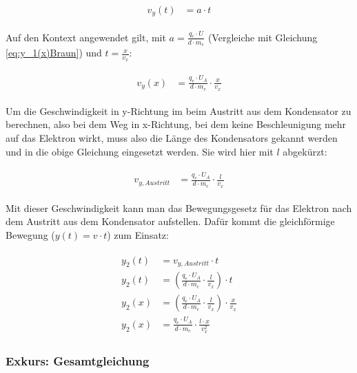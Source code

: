 \begin{align} \label{eq:v(t)Allgemein}
\begin{split}
	v_y(t) &= a \cdot t
\end{split}
\end{align}

\noindent Auf den Kontext angewendet gilt, mit $a = \frac{q_e \cdot U}{d \cdot m_e}$ (Vergleiche mit Gleichung \ref{eq:y_1(x)Braun}) und $t=\frac{x}{v_x}$:

\begin{align} \label{eq:v(x)Kontext}
\begin{split}
	v_y(x) &= \frac{q_e \cdot U_A}{d \cdot m_e} \cdot \frac{x}{v_x}
\end{split}
\end{align}

\noindent Um die Geschwindigkeit in y-Richtung im beim Austritt aus dem Kondensator zu berechnen, also bei dem Weg in x-Richtung, bei dem keine Beschleunigung mehr auf das Elektron wirkt, muss also die Länge des Kondensators gekannt werden und in die obige Gleichung eingesetzt werden. Sie wird hier mit $l$ abgekürzt:

\begin{align} \label{eq:v(t)Gesamt}
\begin{split}
	v_{y,Austritt} &= \frac{q_e \cdot U_A}{d \cdot m_e} \cdot \frac{l}{v_x}
\end{split}
\end{align}

\noindent Mit dieser Geschwindigkeit kann man das Bewegungsgesetz für das Elektron nach dem Austritt aus dem Kondensator aufstellen. Dafür kommt die gleichförmige Bewegung ($y(t) = v \cdot t$) zum Einsatz:

\begin{align} \label{eq:y(t)Gesamt}
\begin{split}
	y_2(t) &= v_{y,Austritt} \cdot t \\
	y_2(t) &= (\frac{q_e \cdot U_A}{d \cdot m_e} \cdot \frac{l}{v_x}) \cdot t \\
	y_2(x) &= (\frac{q_e \cdot U_A}{d \cdot m_e} \cdot \frac{l}{v_x}) \cdot \frac{x}{v_x} \\
	y_2(x) &= \frac{q_e \cdot U_A}{d \cdot m_e} \cdot \frac{l \cdot x}{v_{x}^2}
\end{split}
\end{align}

\subsubsection{Exkurs: Gesamtgleichung}

